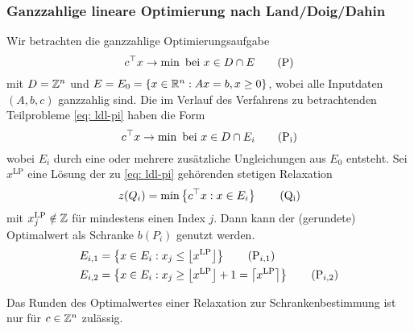 

\subsubsection{Ganzzahlige lineare Optimierung nach Land/Doig/Dahin}

Wir betrachten die ganzzahlige Optimierungsaufgabe 
\begin{equation*}
	c^{\top}x  \to \min \text{ bei } x \in D \cap E
	\tag{P} \label{eq: ldl-p}
\end{equation*}
mit $D = \mathbb{Z}^n$ und $E = E_0 = \left\{ x \in \mathbb{R}^n: Ax = b, x \ge 0 \right\}$, wobei alle Inputdaten $(A,b,c)$ ganzzahlig sind. Die im Verlauf des Verfahrens zu betrachtenden Teilprobleme \eqref{eq: ldl-pi} haben die Form
\begin{equation*}
	\trans{c} x \to \min \bei x \in D \cap E_i
	\tag{P${}_\text{i}$} \label{eq: ldl-pi}
\end{equation*}
wobei $E_i$ durch eine oder mehrere zusätzliche Ungleichungen aus $E_0$ entsteht. Sei $x^{\text{LP}}$ eine Lösung der zu \eqref{eq: ldl-pi} gehörenden stetigen Relaxation
\begin{equation*}
	z(Q_i) = \min \menge{\trans{c} x : x \in E_i} 
	\tag{Q${}_\text{i}$} \label{eq: ldl-qi}
\end{equation*}
mit $x^{\text{LP}}_j \notin \mathbb{Z}$ für mindestens einen Index $j$. Dann kann der (gerundete) Optimalwert als Schranke $b(P_i)$ genutzt werden.
\begin{align*}
	E_{i,1} &= \menge{x \in E_i : x_j \le \left\lfloor x^{\text{LP}} \right\rfloor}
	\tag{P${}_{i,1}$} \\
	E_{i,2} &= \menge{x \in E_i : x_j \ge \left\lfloor x^{\text{LP}} \right\rfloor + 1 = \left\lceil x^{\text{LP}} \right\rceil} 
	\tag{P${}_{i,2}$}	
\end{align*}

\begin{bemerkung}
	Das Runden des Optimalwertes einer Relaxation zur Schrankenbestimmung ist nur für $c \in \mathbb{Z}^n$ zulässig.
\end{bemerkung}

